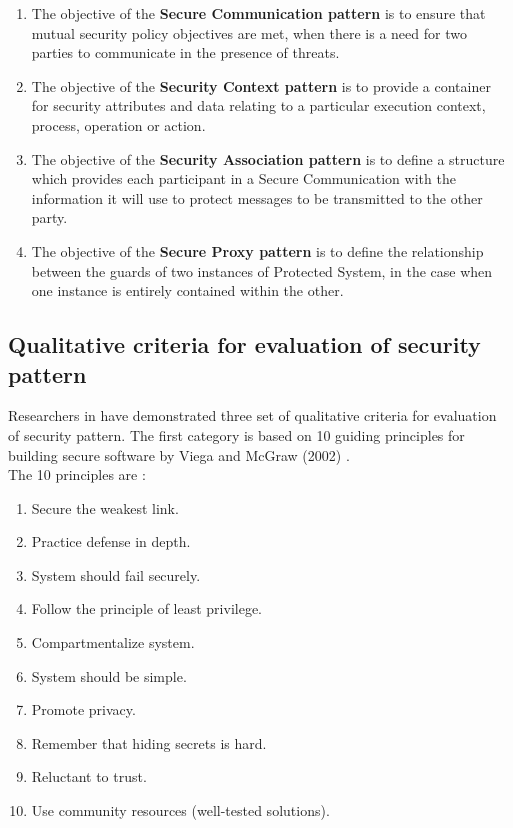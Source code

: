\documentclass[pdftex,english,oribibl]{llncs}
\begin{document}
\begin{enumerate}[(1)]
	\item{The objective of the \textbf{Secure Communication pattern} is to ensure that mutual security policy objectives are met, when there is a need for two parties to communicate in the presence of threats.}
	\item{The objective of the \textbf{Security Context pattern} is to provide a container for security attributes and data relating to a particular execution context, process, operation or action.}
	\item{The objective of the \textbf{Security Association pattern} is to define a structure which provides each participant in a Secure Communication with the information it will use to protect messages to be transmitted to the other party.}
	\item{The objective of the \textbf{Secure Proxy pattern} is to define the relationship between the guards of two instances of Protected System, in the case when one instance is entirely contained within the other.}
\end{enumerate}

\subsection{Qualitative criteria for evaluation of security pattern}
Researchers in \cite{HALKIDIS2006379} have demonstrated three set of qualitative criteria for evaluation of security pattern. The first category is based on 10 guiding principles for building secure software by Viega and McGraw (2002) \cite{GaryMcGraw2002}. \\
The 10 principles are :
\begin{enumerate}
		\item{Secure the weakest link.}
		\item{Practice defense in depth.}
		\item{System should fail securely.}
		\item{Follow the principle of least privilege.}
		\item{Compartmentalize system.}
		\item{System should be simple.}
		\item{Promote privacy.}
		\item{Remember that hiding secrets is hard.}
		\item{Reluctant to trust.}
		\item{Use community resources (well-tested solutions).}
\end{enumerate}
\end{document}
